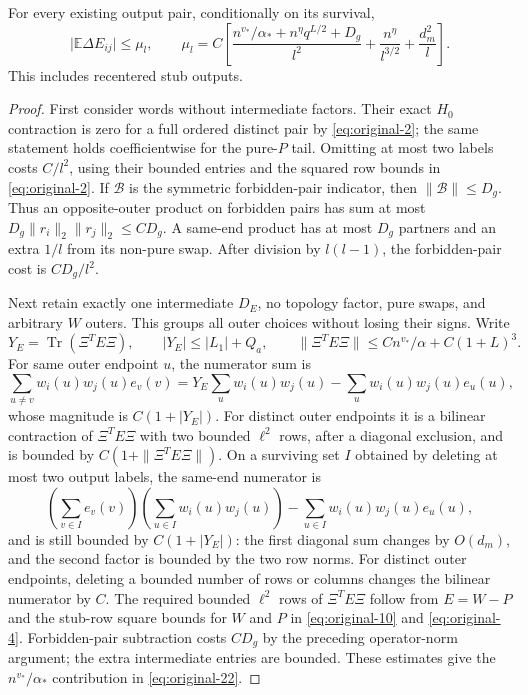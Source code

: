 \begin{lemma}\label{lem:early-entry-mean}
For every existing output pair, conditionally on its survival,
\begin{equation}
 \big|\mathbb E\Delta E_{ij}\big|\le \mu_l,
 \qquad
 \mu_l=C\left[
 \frac{n^{v_*}/\alpha_*+n^\eta q^{L/2}+D_g}{l^2}
 +\frac{n^\eta}{l^{3/2}}+\frac{d_m^2}{l}\right].
\label{eq:original-22}
\end{equation}
This includes recentered stub outputs.
\end{lemma}
\begin{proof}
First consider words without intermediate factors. Their exact
\(H_0\) contraction is zero for a full ordered distinct pair by
\eqref{eq:original-2}; the same statement holds coefficientwise
for the pure-\(P\) tail. Omitting at most two labels costs
\(C/l^2\), using their bounded entries and the squared row bounds
in \eqref{eq:original-2}. If \(\mathcal B\) is the symmetric
forbidden-pair indicator, then \(\|\mathcal B\|\le D_g\).
Thus an opposite-outer product on forbidden pairs has sum at most
\(D_g\|r_i\|_2\|r_j\|_2\le CD_g\). A same-end product has
at most \(D_g\) partners and an extra \(1/l\) from its
non-pure swap. After division by \(l(l-1)\), the forbidden-pair
cost is \(CD_g/l^2\).

Next retain exactly one intermediate \(D_E\), no topology factor,
pure swaps, and arbitrary \(W\) outers. This groups all outer
choices without losing their signs. Write
\[
 Y_E=\operatorname{Tr}(\Xi^TE\Xi),\qquad
 |Y_E|\le |L_1|+Q_a,\qquad
 \|\Xi^TE\Xi\|\le Cn^{v_*}/\alpha+C(1+L)^3.
\]
For same outer endpoint \(u\), the numerator sum is
\[
 \sum_{u\ne v}w_i(u)w_j(u)e_v(v)
 =Y_E\sum_u w_i(u)w_j(u)
   -\sum_u w_i(u)w_j(u)e_u(u),
\]
whose magnitude is \(C(1+|Y_E|)\). For distinct outer endpoints
it is a bilinear contraction of \(\Xi^TE\Xi\) with two bounded
\(\ell^2\) rows, after a diagonal exclusion, and is bounded by
\(C(1+\|\Xi^TE\Xi\|)\). On a surviving set \(I\) obtained
by deleting at most two output labels, the same-end numerator is
\[
 \left(\sum_{v\in I}e_v(v)\right)
 \left(\sum_{u\in I}w_i(u)w_j(u)\right)
 -\sum_{u\in I}w_i(u)w_j(u)e_u(u),
\]
and is still bounded by \(C(1+|Y_E|)\): the first diagonal sum
changes by \(O(d_m)\), and the second factor is bounded by the
two row norms. For distinct outer endpoints, deleting a bounded
number of rows or columns changes the bilinear numerator by
\(C\). The required bounded \(\ell^2\) rows of \(\Xi^TE\Xi\)
follow from \(E=W-P\) and the stub-row square bounds for \(W\)
and \(P\) in \eqref{eq:original-10} and \eqref{eq:original-4}.
Forbidden-pair subtraction costs \(CD_g\) by the preceding
operator-norm argument; the extra intermediate entries are bounded.
These estimates give the \(n^{v_*}/\alpha_*\) contribution in
\eqref{eq:original-22}.


\end{proof}
